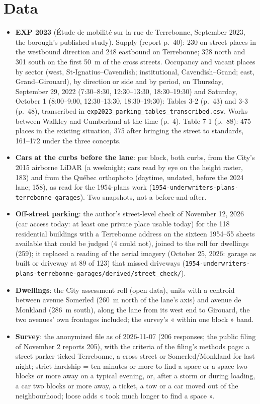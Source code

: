 \documentclass[11pt,a4paper]{article}
\begin{document}
\section{Data}
\begin{itemize}
\item \textbf{EXP 2023} (Étude de mobilité sur la rue de Terrebonne, September 2023, the borough\textquoteright{}s published study). Supply (report p.~40): 230 on-street places in the westbound direction and 248 eastbound on Terrebonne; 328 north and 301 south on the first 50~m of the cross streets. Occupancy and vacant places by sector (west, St-Ignatius--Cavendish; institutional, Cavendish--Grand; east, Grand--Girouard), by direction or side and by period, on Thursday, September 29, 2022 (7:30--8:30, 12:30--13:30, 18:30--19:30) and Saturday, October 1 (8:00--9:00, 12:30--13:30, 18:30--19:30): Tables 3-2 (p.~43) and 3-3 (p.~48), transcribed in \texttt{exp2023\_parking\_tables\_transcribed.csv}. Works between Walkley and Cumberland at the time (p.~4). Table 7-1 (p.~88): 475 places in the existing situation, 375 after bringing the street to standards, 161--172 under the three concepts.
\item \textbf{Cars at the curbs before the lane}: per block, both curbs, from the City\textquoteright{}s 2015 airborne LiDAR (a weeknight; cars read by eye on the height raster, 183) and from the Québec orthophoto (daytime, undated, before the 2024 lane; 158), as read for the 1954-plans work (\texttt{1954-underwriters-plans-terrebonne-garages}). Two snapshots, not a before-and-after.
\item \textbf{Off-street parking}: the author\textquoteright{}s street-level check of November 12, 2026 (car access today: at least one private place usable today) for the 118 residential buildings with a Terrebonne address on the sixteen 1954--55 sheets available that could be judged (4 could not), joined to the roll for dwellings (259); it replaced a reading of the aerial imagery (October 25, 2026: garage as built or driveway at 89 of 123) that missed driveways (\texttt{1954-underwriters-plans-terrebonne-garages/derived/street\_check/}).
\item \textbf{Dwellings}: the City assessment roll (open data), units with a centroid between avenue Somerled (260~m north of the lane\textquoteright{}s axis) and avenue de Monkland (286~m south), along the lane from its west end to Girouard, the two avenues\textquoteright{} own frontages included; the survey\textquoteright{}s « within one block » band.
\item \textbf{Survey}: the anonymized file as of 2026-11-07 (206 responses; the public filing of November 2 reports 205), with the criteria of the filing\textquoteright{}s methods page: a street parker ticked Terrebonne, a cross street or Somerled/Monkland for last night; strict hardship = ten minutes or more to find a space or a space two blocks or more away on a typical evening, or, after a storm or during loading, a car two blocks or more away, a ticket, a tow or a car moved out of the neighbourhood; loose adds « took much longer to find a space ».

\end{itemize}
\end{document}

